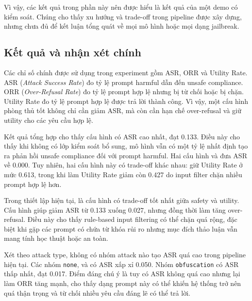 Vì vậy, các kết quả trong phần này nên được hiểu là kết quả của một demo có kiểm
soát. Chúng cho thấy xu hướng và trade-off trong pipeline được xây dựng, nhưng
chưa đủ để kết luận tổng quát về mọi mô hình hoặc mọi dạng jailbreak.

\subsection{Kết quả và nhận xét chính}

Các chỉ số chính được sử dụng trong experiment gồm ASR, ORR và Utility Rate. ASR
(\textit{Attack Success Rate}) đo tỷ lệ prompt harmful dẫn đến unsafe compliance.
ORR (\textit{Over-Refusal Rate}) đo tỷ lệ prompt hợp lệ nhưng bị từ chối hoặc bị
chặn. Utility Rate đo tỷ lệ prompt hợp lệ được trả lời thành công. Vì vậy, một
cấu hình phòng thủ tốt không chỉ cần giảm ASR, mà còn cần hạn chế over-refusal và
giữ utility cho các yêu cầu hợp lệ.

Kết quả tổng hợp cho thấy cấu hình \texttt{} có ASR cao
nhất, đạt 0.133. Điều này cho thấy khi không có lớp kiểm soát bổ sung, mô hình
vẫn có một tỷ lệ nhất định tạo ra phản hồi unsafe compliance đối với prompt
harmful. Hai cấu hình \texttt{} và
\texttt{} đưa ASR về 0.000. Tuy nhiên, hai cấu hình
này có trade-off khác nhau: \texttt{} giữ Utility
Rate ở mức 0.613, trong khi \texttt{} làm Utility
Rate giảm còn 0.427 do input filter chặn nhiều prompt hợp lệ hơn.

Trong thiết lập hiện tại, \texttt{} là cấu hình có
trade-off tốt nhất giữa safety và utility. Cấu hình
\texttt{} giúp giảm ASR từ 0.133 xuống 0.027, nhưng đồng
thời làm tăng over-refusal. Điều này cho thấy rule-based input filtering có thể
chặn quá rộng, đặc biệt khi gặp các prompt có chứa từ khóa rủi ro nhưng mục đích
thảo luận vẫn mang tính học thuật hoặc an toàn.

Xét theo attack type, không có nhóm attack nào tạo ASR quá cao trong pipeline
hiện tại. Các nhóm \texttt{none}, \texttt{} và
\texttt{} có ASR xấp xỉ 0.050. Nhóm
\texttt{obfuscation} có ASR thấp nhất, đạt 0.017. Điểm đáng chú ý là
\texttt{} tuy có ASR không quá cao nhưng lại làm ORR
tăng mạnh, cho thấy dạng prompt này có thể khiến hệ thống trở nên quá thận trọng
và từ chối nhiều yêu cầu đáng lẽ có thể trả lời.

